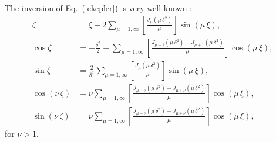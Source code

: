 \documentclass{iopjournal}
\begin{document}
The inversion of Eq.~(\ref{ekepler}) is very well known \cite{bc}:
\begin{align}\label{e9a1}
\zeta &= \xi + 2\sum_{\mu=1,\infty}\left[\frac{J_\mu(\mu\,\delta^2)}{\mu}\right]\sin(\mu\,\xi),\\[0.5ex]
\cos\zeta &=-\frac{\delta^2}{2}+\sum_{\mu=1,\infty}\left[\frac{J_{\mu-1}(\mu\,\delta^2)-J_{\mu+1}(\mu\,\delta^2)}{\mu}\right]\cos(\mu\,\xi),\\[0.5ex]
\sin\zeta &=\frac{2}{\delta^2}\sum_{\mu=1,\infty}\left[\frac{J_\mu(\mu\,\delta^2)}{\mu}\right]\sin(\mu\,\xi),\label{e9a3}\\[0.5ex]
\cos(\nu\,\zeta)&= \nu\sum_{\mu=1,\infty}\left[\frac{J_{\mu-\nu}(\mu\,\delta^2)-J_{\mu+\nu}(\mu\,\delta^2)}{\mu}\right]\cos(\mu\,\xi),\\[0.5ex]
\sin(\nu\,\zeta)&= \nu\sum_{\mu=1,\infty}\left[\frac{J_{\mu-\nu}(\mu\,\delta^2)+J_{\mu+\nu}(\mu\,\delta^2)}{\mu}\right]\cos(\mu\,\xi),\
\end{align}
for $\nu>1$. 
\end{document}
